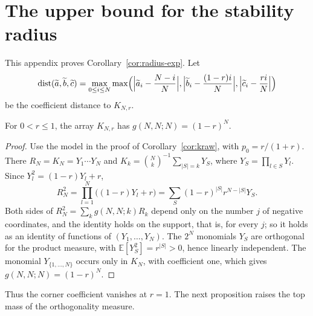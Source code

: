 \appendix
\section{The upper bound for the stability radius}\label{app:radius}

This appendix proves Corollary~\ref{cor:radius-exp}. Let
\[
\operatorname{dist}(\widetilde a,\widetilde b,\widetilde c)=\max_{0\leq i\leq N}\max\Bigl(\Bigl|\widetilde a_i-\frac{N-i}N\Bigr|,\Bigl|\widetilde b_i-\frac{(1-r)i}N\Bigr|,\Bigl|\widetilde c_i-\frac{ri}N\Bigr|\Bigr)
\]
be the coefficient distance to $K_{N,r}$.

\begin{lemma}\label{lem:corner-value}
For $0<r\leq1$, the array $K_{N,r}$ has $g(N,N;N)=(1-r)^N$.
\end{lemma}
\begin{proof}
Use the model in the proof of Corollary~\ref{cor:kraw}, with $p_0=r/(1+r)$. There $R_N=K_N=Y_1\cdots Y_N$ and $K_k=\binom Nk^{-1}\sum_{|S|=k}Y_S$, where $Y_S=\prod_{l\in S}Y_l$. Since $Y_l^2=(1-r)Y_l+r$,
\[
R_N^2=\prod_{l=1}^N\bigl((1-r)Y_l+r\bigr)=\sum_S(1-r)^{|S|}r^{N-|S|}Y_S.
\]
Both sides of $R_N^2=\sum_kg(N,N;k)R_k$ depend only on the number $j$ of negative coordinates, and the identity holds on the support, that is, for every $j$; so it holds as an identity of functions of $(Y_1,\ldots,Y_N)$. The $2^N$ monomials $Y_S$ are orthogonal for the product measure, with $\mathbb E[Y_S^2]=r^{|S|}>0$, hence linearly independent. The monomial $Y_{\{1,\ldots,N\}}$ occurs only in $K_N$, with coefficient one, which gives $g(N,N;N)=(1-r)^N$.
\end{proof}

Thus the corner coefficient vanishes at $r=1$. The next proposition raises the top mass of the orthogonality measure.

